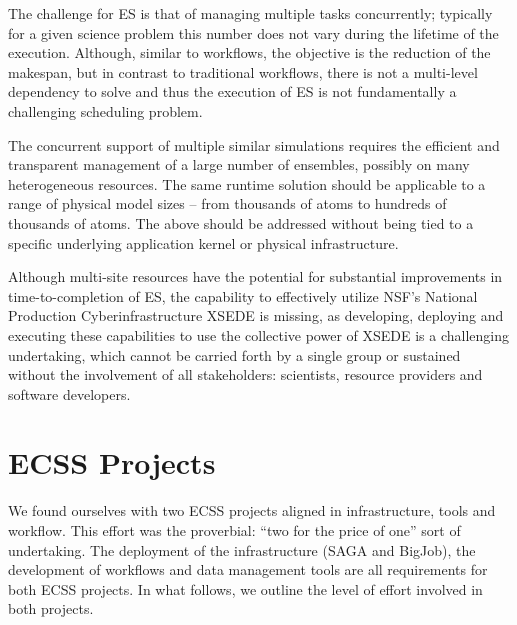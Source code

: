 \documentclass{sig-alternate}
\begin{document}


The challenge for ES is that of managing multiple tasks concurrently;
typically for a given science problem this number does not vary during
the lifetime of the execution. Although, similar to workflows, the
objective is the reduction of the makespan, but in contrast to
traditional workflows, there is not a multi-level dependency to solve
and thus the execution of ES is not fundamentally a challenging
scheduling problem.

The concurrent support of multiple similar simulations requires the
efficient and transparent management of a large number of ensembles,
possibly on many heterogeneous resources. The same runtime solution
should be applicable to a range of physical model sizes -- from
thousands of atoms to hundreds of thousands of atoms.%
The above should be addressed without being tied to a specific
underlying application kernel or physical infrastructure. 
 
Although multi-site resources have the potential for substantial
improvements in time-to-completion of ES, the capability to
effectively utilize NSF's National Production Cyberinfrastructure
XSEDE is missing, as developing, deploying and executing these
capabilities to use the collective power of XSEDE is a challenging
undertaking, which cannot be carried forth by a single group or
sustained without the involvement of all stakeholders: scientists,
resource providers and software developers.

\section{ECSS Projects}

We found ourselves with two ECSS projects aligned in infrastructure, tools and
workflow. This effort was the proverbial: ``two for the price of one'' sort
of undertaking. The deployment of the infrastructure (SAGA and BigJob), the
development of workflows and data management tools are all requirements
for both ECSS projects. In what follows, we outline the level of effort involved
in both projects.
\end{document}
